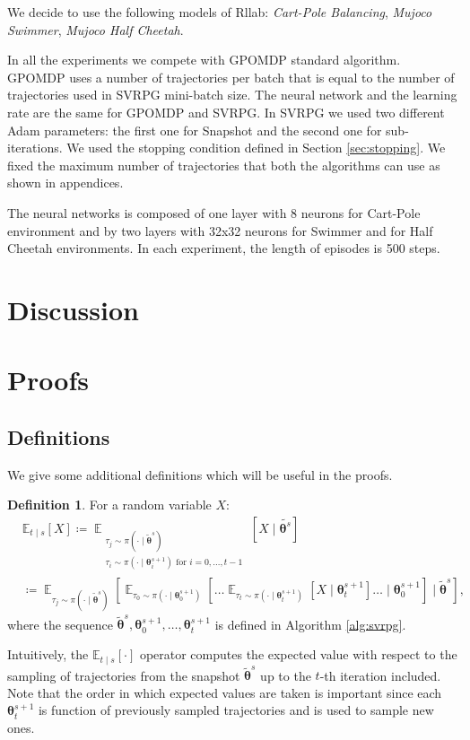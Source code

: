\documentclass{article}
\theoremstyle{remark}
\theoremstyle{definition}
\newtheorem{definition}{Definition}[section]
\DeclareMathOperator*{\EV}{\mathbb{E}}
\newcommand{\EVV}[2][\ppvect \in \ppspace]{\EV_{#1}\left[{#2}\right]}
\newcommand{\vtheta}{\boldsymbol{\theta}}
\newcommand{\Ets}[2][t]{\mathbb{E}_{#1\mid s}\left[#2\right]}
\begin{document}
We decide to use the following models of Rllab: \emph{Cart-Pole Balancing}, \emph{Mujoco Swimmer}, \emph{Mujoco Half Cheetah}.


In all the experiments we compete with GPOMDP standard algorithm. GPOMDP uses a number of trajectories per batch that is equal to the number of trajectories used in SVRPG mini-batch size.
The neural network and the learning rate are the same for GPOMDP and SVRPG.
In SVRPG we used two different Adam parameters: the first one for Snapshot and the second one for sub-iterations.
We used the stopping condition defined in Section \ref{sec:stopping}.
We fixed the maximum number of trajectories that both the algorithms can use as shown in appendices. 

The neural networks is composed of one layer with 8 neurons for Cart-Pole environment and by two layers with 32x32 neurons for Swimmer and for Half Cheetah environments. In each experiment, the length of episodes is 500 steps.

\section{Discussion}




\newpage
\mbox{}
\newpage
\onecolumn
\appendix

\section{Proofs}\label{app:proofs}

\subsection*{Definitions}
We give some additional definitions which will be useful in the proofs.
\begin{definition}
For a random variable $X$:
\begin{align*}
	&\mathbb{E}_{t\mid s}\left[X\right] \coloneqq 
		\mathop{\mathbb{E}}_{\substack{\tau_j\sim\pi(\cdot\mid\tilde{\vtheta}^s) \\ \tau_i\sim\pi(\cdot\mid\vtheta^{s+1}_i)\text{ for $i=0,\dots,t-1$}}}{\left[X \mid \tilde{\vtheta^s}\right]} \\
	&\coloneqq \EVV[\tau_j\sim\pi(\cdot\mid\tilde{\vtheta}^s)]{
			\EVV[\tau_0\sim\pi(\cdot\mid\vtheta_0^{s+1})]
				{\dots
					\EVV[\tau_t\sim\pi(\cdot\mid\vtheta_t^{s+1})]
						{X\mid\vtheta_t^{s+1}}
				 \dots
			\mid\vtheta_0^{s+1}}
		\mid\tilde{\vtheta}^s},
\end{align*}
where the sequence $\tilde{\vtheta}^s,\vtheta_0^{s+1},\dots,\vtheta_t^{s+1}$ is defined in Algorithm \ref{alg:svrpg}. 
\end{definition}
Intuitively, the $\Ets{\cdot}$ operator computes the expected value with respect to the sampling of trajectories from the snapshot $\tilde{\vtheta}^s$ up to the $t$-th iteration included. Note that the order in which expected values are taken is important since each $\vtheta_{t}^{s+1}$ is function of previously sampled trajectories and is used to sample new ones.
\end{document}
